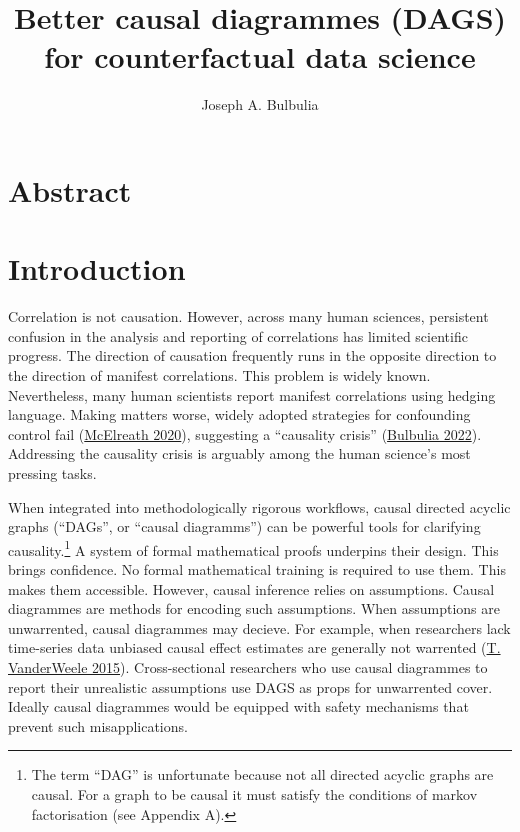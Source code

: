 \documentclass[
  singlecolumn]{report}
\title{Better causal diagrammes (DAGS) for counterfactual data science}
\author{Joseph A. Bulbulia}
\date{}
\begin{document}
\maketitle
\ifdefined\Shaded\renewenvironment{Shaded}{\begin{tcolorbox}[interior hidden, enhanced, borderline west={3pt}{0pt}{shadecolor}, sharp corners, frame hidden, breakable, boxrule=0pt]}{\end{tcolorbox}}\fi

\listoffigures
\listoftables
\hypertarget{abstract}{%
\section{Abstract}\label{abstract}}

\hypertarget{introduction}{%
\section{Introduction}\label{introduction}}

Correlation is not causation. However, across many human sciences,
persistent confusion in the analysis and reporting of correlations has
limited scientific progress. The direction of causation frequently runs
in the opposite direction to the direction of manifest correlations.
This problem is widely known. Nevertheless, many human scientists report
manifest correlations using hedging language. Making matters worse,
widely adopted strategies for confounding control fail
(\protect\hyperlink{ref-mcelreath2020}{McElreath 2020}), suggesting a
``causality crisis'' (\protect\hyperlink{ref-bulbulia2022}{Bulbulia
2022}). Addressing the causality crisis is arguably among the human
science's most pressing tasks.

When integrated into methodologically rigorous workflows, causal
directed acyclic graphs (``DAGs'', or ``causal diagramms'') can be
powerful tools for clarifying causality.\footnote{The term ``DAG'' is
  unfortunate because not all directed acyclic graphs are causal. For a
  graph to be causal it must satisfy the conditions of markov
  factorisation (see Appendix A).} A system of formal mathematical
proofs underpins their design. This brings confidence. No formal
mathematical training is required to use them. This makes them
accessible. However, causal inference relies on assumptions. Causal
diagrammes are methods for encoding such assumptions. When assumptions
are unwarrented, causal diagrammes may decieve. For example, when
researchers lack time-series data unbiased causal effect estimates are
generally not warrented (\protect\hyperlink{ref-vanderweele2015}{T.
VanderWeele 2015}). Cross-sectional researchers who use causal
diagrammes to report their unrealistic assumptions use DAGS as props for
unwarrented cover. Ideally causal diagrammes would be equipped with
safety mechanisms that prevent such misapplications.
\end{document}
